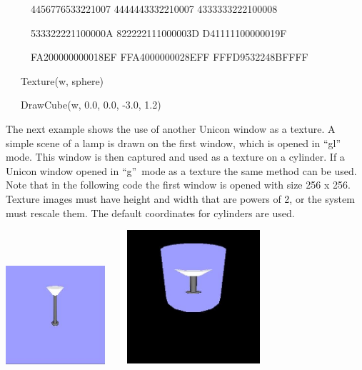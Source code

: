 \documentclass[letterpaper]{article}
\begin{document}
{\sffamily
\ \ \ \ \ {\textquotedbl}4456776533221007 4444443332210007 4333333222100008{\textquotedbl}{\textbar}{\textbar}}

{\sffamily
\ \ \ \ \ {\textquotedbl}533322221100000A 822222111000003D D41111100000019F{\textquotedbl}{\textbar}{\textbar}}

{\sffamily
\ \ \ \ \ {\textquotedbl}FA200000000018EF FFA4000000028EFF FFFD9532248BFFFF{\textquotedbl}}

{\sffamily
\ \ \ Texture(w, sphere)}

{\sffamily
\ \ \ DrawCube(w, 0.0, 0.0, -3.0, 1.2)}


\bigskip

{
The next example shows the use of another Unicon window as a texture. A simple scene of a lamp is drawn on the first
window, which is opened in \textsf{{}``gl''} mode. This window is then captured and used as a texture on a cylinder. If
a Unicon window opened in \textsf{{}``g''}\texttt{ }mode as a texture the same method can be used. Note that in the
following code the first window is opened with size 256 x 256. Texture images must have height and width that are
powers of 2, or the system must rescale them. The default coordinates for cylinders are used.}


\bigskip


\bigskip

{\centering{}
 \includegraphics[width=1.4492in,height=1.4335in]{utr9/utr9-img028.jpg} \texttt{ \ \ }
\includegraphics[width=1.939in,height=1.952in]{utr9/utr9-img029.jpg} \texttt{ \ \ }
\par}
\end{document}
